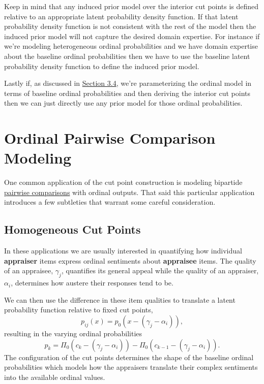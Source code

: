 \documentclass[
  letterpaper,
  DIV=11,
  numbers=noendperiod]{scrartcl}
\begin{document}
Keep in mind that any induced prior model over the interior cut points
is defined relative to an appropriate latent probability density
function. If that latent probability density function is not consistent
with the rest of the model then the induced prior model will not capture
the desired domain expertise. For instance if we're modeling
heterogeneous ordinal probabilities and we have domain expertise about
the baseline ordinal probabilities then we have to use the baseline
latent probability density function to define the induced prior model.

Lastly if, as discussed in \hyperref[derived-cuts]{Section 3.4}, we're
parameterizing the ordinal model in terms of baseline ordinal
probabilities and then deriving the interior cut points then we can just
directly use any prior model for those ordinal probabilities.

\section{Ordinal Pairwise Comparison
Modeling}\label{ordinal-pairwise-comparison-modeling}

One common application of the cut point construction is modeling
bipartide
\href{https://betanalpha.github.io/assets/chapters_html/pairwise_comparison_modeling.html}{pairwise
comparisons} with ordinal outputs. That said this particular application
introduces a few subtleties that warrant some careful consideration.

\subsection{Homogeneous Cut Points}\label{homogeneous-cut-points}

In these applications we are usually interested in quantifying how
individual \textbf{appraiser} items express ordinal sentiments about
\textbf{appraisee} items. The quality of an appraisee, \(\gamma_{j}\),
quantifies its general appeal while the quality of an appraiser,
\(\alpha_{i}\), determines how austere their responses tend to be.

We can then use the difference in these item qualities to translate a
latent probability function relative to fixed cut points, \[
p_{ij}(x) = p_{0}(x - (\gamma_{j} - \alpha_{i}) ),
\] resulting in the varying ordinal probabilities \[
p_{k} =
  \Pi_{0}( c_{k}     - (\gamma_{j} - \alpha_{i}) )
- \Pi_{0}( c_{k - 1} - (\gamma_{j} - \alpha_{i}) ).
\] The configuration of the cut points determines the shape of the
baseline ordinal probabilities which models how the appraisers translate
their complex sentiments into the available ordinal values.
\end{document}
